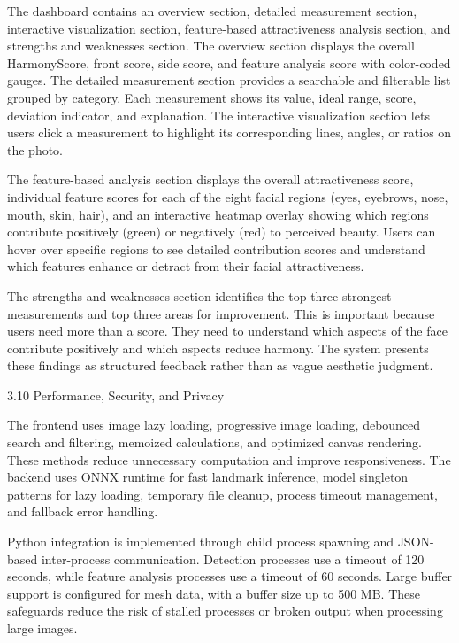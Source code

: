 The dashboard contains an overview section, detailed measurement section, interactive visualization section, feature-based attractiveness analysis section, and strengths and weaknesses section. The overview section displays the overall HarmonyScore, front score, side score, and feature analysis score with color-coded gauges. The detailed measurement section provides a searchable and filterable list grouped by category. Each measurement shows its value, ideal range, score, deviation indicator, and explanation. The interactive visualization section lets users click a measurement to highlight its corresponding lines, angles, or ratios on the photo.

The feature-based analysis section displays the overall attractiveness score, individual feature scores for each of the eight facial regions (eyes, eyebrows, nose, mouth, skin, hair), and an interactive heatmap overlay showing which regions contribute positively (green) or negatively (red) to perceived beauty. Users can hover over specific regions to see detailed contribution scores and understand which features enhance or detract from their facial attractiveness.

The strengths and weaknesses section identifies the top three strongest measurements and top three areas for improvement. This is important because users need more than a score. They need to understand which aspects of the face contribute positively and which aspects reduce harmony. The system presents these findings as structured feedback rather than as vague aesthetic judgment.

3.10  Performance, Security, and Privacy

The frontend uses image lazy loading, progressive image loading, debounced search and filtering, memoized calculations, and optimized canvas rendering. These methods reduce unnecessary computation and improve responsiveness. The backend uses ONNX runtime for fast landmark inference, model singleton patterns for lazy loading, temporary file cleanup, process timeout management, and fallback error handling.

Python integration is implemented through child process spawning and JSON-based inter-process communication. Detection processes use a timeout of 120 seconds, while feature analysis processes use a timeout of 60 seconds. Large buffer support is configured for mesh data, with a buffer size up to 500 MB. These safeguards reduce the risk of stalled processes or broken output when processing large images.

